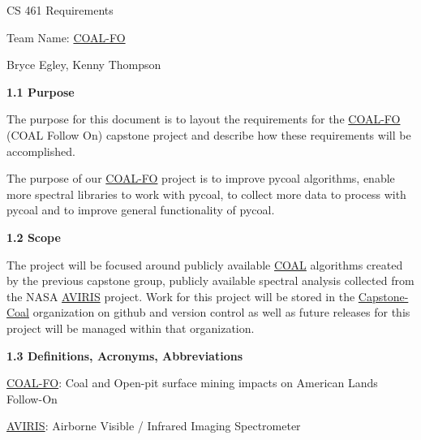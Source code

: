 \documentclass[a4paper,12pt]{article}
\begin{document}
\sloppy

\noindent CS 461 Requirements\newline


\noindent Team Name: \href{https://capstone-coal.github.io/team}{COAL-FO}\newline


\noindent Bryce Egley, Kenny Thompson\newline


\newline


\noindent \textbf{1.1 Purpose}\newline


\noindent The purpose for this document is to layout the requirements for the \href{https://capstone-coal.github.io/team}{COAL-FO} (COAL Follow On) capstone project and describe how these requirements will be accomplished. \newline

\noindent The purpose of our \href{https://capstone-coal.github.io/team}{COAL-FO} project is to improve pycoal algorithms, enable more spectral libraries to work with pycoal, to collect more data to process with pycoal and to improve general functionality of pycoal. \newline

\noindent \textbf{1.2 Scope}\newline


\noindent The project will be focused around publicly available \href{https://capstone-coal.github.io/}{COAL} algorithms created by the previous capstone group, publicly available spectral analysis collected from the NASA \href{https://aviris.jpl.nasa.gov/}{AVIRIS} project. Work for this project will be stored in the \href{https://github.com/capstone-coal}{Capstone-Coal} organization on github and version control as well as future releases for this project will be managed within that organization.\newline


\noindent \textbf{1.3 Definitions, Acronyms, Abbreviations}\newline


\noindent \href{https://capstone-coal.github.io/team}{COAL-FO}: Coal and Open-pit surface mining impacts on American Lands Follow-On\newline

\noindent \href{https://aviris.jpl.nasa.gov/}{AVIRIS}: Airborne Visible / Infrared Imaging Spectrometer\newline
\end{document}
